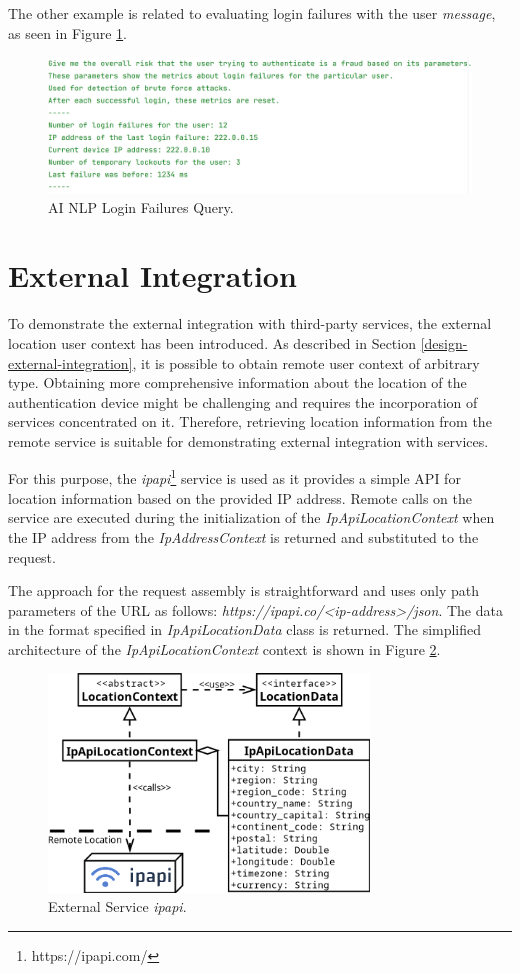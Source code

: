 The other example is related to evaluating login failures with the user \textit{message}, as seen in Figure \ref{fig:impl-ai-login-message}.

\begin{figure}[htbp]
  \centering
  \includegraphics[width=1\textwidth]{img/sections/6-implementation/aiLoginFailureMessage.png}
  \caption{AI NLP Login Failures Query.}
  \label{fig:impl-ai-login-message}
\end{figure}

\section{External Integration}
To demonstrate the external integration with third-party services, the external location user context has been introduced.
As described in Section \ref{design-external-integration}, it is possible to obtain remote user context of arbitrary type.
Obtaining more comprehensive information about the location of the authentication device might be challenging and requires the incorporation of services concentrated on it.
Therefore, retrieving location information from the remote service is suitable for demonstrating external integration with services. 

\newpage

For this purpose, the \textit{ipapi}\footnote{https://ipapi.com/} service is used as it provides a simple API for location information based on the provided IP address.
Remote calls on the service are executed during the initialization of the \textit{IpApiLocationContext} when the IP address from the \textit{IpAddressContext} is returned and substituted to the request.

The approach for the request assembly is straightforward and uses only path parameters of the URL as follows:
\textit{https://ipapi.co/<ip-address>/json}.
The data in the format specified in \textit{IpApiLocationData} class is returned.
The simplified architecture of the \textit{IpApiLocationContext} context is shown in Figure \ref{fig:impl-external-ipapi}.

\begin{figure}[htbp]
  \centering
  \includegraphics[width=0.76\textwidth]{img/sections/6-implementation/location-diagram-ipapi.png}
  \caption{External Service \textit{ipapi}.}
  \label{fig:impl-external-ipapi}
\end{figure}

\shorthandoff{-}